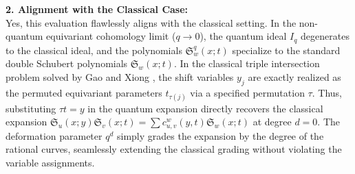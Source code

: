 \documentclass{amsart}
\theoremstyle{definition}
\begin{document}
\vspace{2mm}
\noindent\textbf{2. Alignment with the Classical Case:}\\
Yes, this evaluation flawlessly aligns with the classical setting. In the non-quantum equivariant cohomology limit ($q \to 0$), the quantum ideal $I_q$ degenerates to the classical ideal, and the polynomials $\mathfrak{S}_w^q(x;t)$ specialize to the standard double Schubert polynomials $\mathfrak{S}_w(x;t)$. In the classical triple intersection problem solved by Gao and Xiong \cite{GaoXiong2023}, the shift variables $y_j$ are exactly realized as the permuted equivariant parameters $t_{\tau(j)}$ via a specified permutation $\tau$. Thus, substituting $\tau t = y$ in the quantum expansion directly recovers the classical expansion $\mathfrak{S}_u(x;y) \mathfrak{S}_v(x;t) = \sum c_{u,v}^w(y,t) \mathfrak{S}_w(x;t)$ at degree $d=0$. The deformation parameter $q^d$ simply grades the expansion by the degree of the rational curves, seamlessly extending the classical grading without violating the variable assignments.
\end{document}
